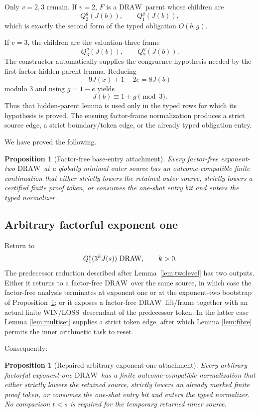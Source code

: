 \documentclass[11pt]{article}
\newtheorem{proposition}[theorem]{Proposition}
\newcommand{\WIN}{\ensuremath{\mathrm{WIN}}}
\newcommand{\LOSS}{\ensuremath{\mathrm{LOSS}}}
\newcommand{\DRAW}{\ensuremath{\mathrm{DRAW}}}
\begin{document}
Only $v=2,3$ remain. If $v=2$, $F$ is a \DRAW\ parent whose children are
\[
 Q_2^g(J(b)),\qquad Q_1^g(J(b)),
\]
which is exactly the second form of the typed obligation $O(b,g)$.

If $v=3$, the children are the valuation-three frame
\[
 Q_3^g(J(b)),\qquad Q_2^g(J(b)).
\]
The constructor automatically supplies the congruence hypothesis needed by
the first-factor hidden-parent lemma. Reducing
\[
 9J(x)+1-2e=8J(b)
\]
modulo $3$ and using $g=1-e$ yields
\[
 \boxed{J(b)\equiv1+g\pmod3.}
\]
Thus that hidden-parent lemma is used only in the typed rows for which its
hypothesis is proved. The ensuing factor-frame normalization produces a
strict source edge, a strict boundary/token edge, or the already typed
obligation entry.

We have proved the following.

\begin{proposition}[Factor-free base-entry attachment]\label{prop:baseattach}
Every factor-free exponent-two \DRAW\ at a globally minimal outer source has
an outcome-compatible finite continuation that either strictly lowers the
retained outer source, strictly lowers a certified finite proof token, or
consumes the one-shot entry bit and enters the typed normalizer.
\end{proposition}

\subsection{Arbitrary factorful exponent one}

Return to
\[
 Q_1^e(3^kJ(s))\text{ \DRAW},\qquad k>0.
\]
The predecessor reduction described after Lemma~\ref{lem:twolevel} has two
outputs. Either it returns to a factor-free \DRAW\ over the same source, in
which case the factor-free analysis terminates at exponent one or at the
exponent-two bootstrap of Proposition~\ref{prop:baseattach}; or it exposes a
factor-free \DRAW\ lift/frame together with an actual finite \WIN/\LOSS\
descendant of the predecessor token. In the latter case Lemma
\ref{lem:multiset} supplies a strict token edge, after which Lemma
\ref{lem:fibre} permits the inner arithmetic task to reset.

Consequently:
\begin{proposition}[Repaired arbitrary exponent-one attachment]\label{prop:attachment}
Every arbitrary factorful exponent-one \DRAW\ has a finite outcome-compatible
normalization that either strictly lowers the retained source, strictly lowers
an already marked finite proof token, or consumes the one-shot entry bit and
enters the typed normalizer. No comparison $t<s$ is required for the temporary
returned inner source.
\end{proposition}
\end{document}
